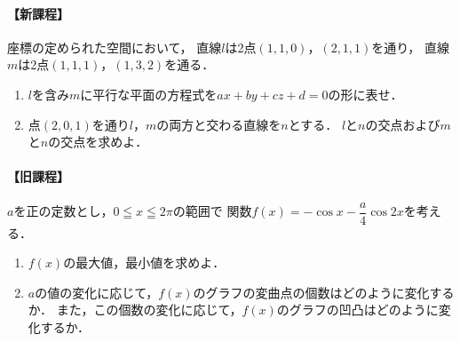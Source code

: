 \documentclass[../../main.tex]{subfiles}
\begin{document}
\paragraph{【新課程】}
座標の定められた空間において，
直線$l$は2点$(1,1,0)$，$(2,1,1)$を通り，
直線$m$は2点$(1,1,1)$，$(1,3,2)$を通る．
\begin{enumerate}[(1)]
  \item $l$を含み$m$に平行な平面の方程式を$ax+by+cz+d=0$の形に表せ．
  \item 点$(2,0,1)$を通り$l$，$m$の両方と交わる直線を$n$とする．
    $l$と$n$の交点および$m$と$n$の交点を求めよ．
\end{enumerate}

\paragraph{【旧課程】}
$a$を正の定数とし，$0 \leqq x \leqq 2\pi$の範囲で
関数$f(x)=-\cos x-\dfrac{a}{4}\cos 2x$を考える．
\begin{enumerate}[(1)]
  \item $f(x)$の最大値，最小値を求めよ．
  \item $a$の値の変化に応じて，$f(x)$のグラフの変曲点の個数はどのように変化するか．
    また，この個数の変化に応じて，$f(x)$のグラフの凹凸はどのように変化するか．
\end{enumerate}
\end{document}
